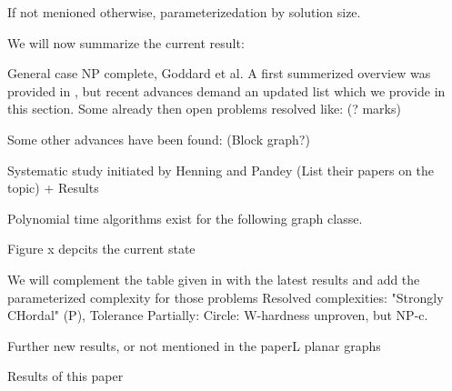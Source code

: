 If not menioned otherwise, parameterizedation by solution size.


We will now summarize the current result:

General case NP complete, Goddard et al.
A first summerized overview was provided in \cite{Galby2020}, but recent advances demand an updated list which we provide in this section. 
Some already then open problems resolved like: (? marks)

Some other advances have been found: (Block graph?)

Systematic study initiated by Henning and Pandey (List their papers on the topic) + Results

Polynomial time algorithms exist for the following graph classe.

Figure x depcits the current state

We will complement the table given in \cite{Galby2020} with the latest results and add the parameterized complexity for those problems
Resolved complexities: "Strongly CHordal" (P), Tolerance 
Partially: Circle: W-hardness unproven, but NP-c.

Further new results, or not mentioned in the paperL planar graphs



Results of this paper

